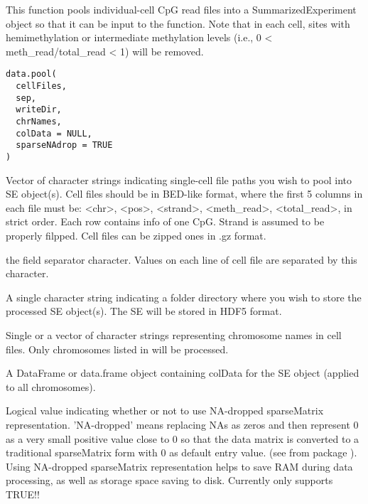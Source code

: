 \documentclass[letterpaper]{book}
\begin{document}
%
\begin{Description}
This function pools individual-cell CpG read files into a
SummarizedExperiment object so that it can be input to the 
function. Note that in each cell, sites with hemimethylation or intermediate
methylation levels (i.e., 0 < meth\_read/total\_read < 1) will be removed.
\end{Description}
%
\begin{Usage}
\begin{verbatim}
data.pool(
  cellFiles,
  sep,
  writeDir,
  chrNames,
  colData = NULL,
  sparseNAdrop = TRUE
)
\end{verbatim}
\end{Usage}
%
\begin{Arguments}
\begin{ldescription}
\item[\code{cellFiles}] Vector of character strings indicating single-cell file
paths you wish to pool into SE object(s). Cell files should be in BED-like
format, where the first 5 columns in each file must be: <chr>, <pos>, <strand>,
<meth\_read>, <total\_read>, in strict order. Each row contains info of one CpG.
Strand is assumed to be properly filpped. Cell files can be zipped ones in .gz
format.

\item[\code{sep}] the field separator character. Values on each line of cell file are
separated by this character.

\item[\code{writeDir}] A single character string indicating a folder directory where
you wish to store the processed SE object(s). The SE will be stored in HDF5 format.

\item[\code{chrNames}] Single or a vector of character strings representing chromosome
names in cell files. Only chromosomes listed in  will be
processed.

\item[\code{colData}] A DataFrame or data.frame object containing colData for the SE
object (applied to all chromosomes).

\item[\code{sparseNAdrop}] Logical value indicating whether or not to use NA-dropped
sparseMatrix representation. 'NA-dropped' means replacing NAs as zeros and
then represent 0 as a very small positive value close to 0 so that the data
matrix is converted to a traditional sparseMatrix form with 0 as default
entry value. (see  from package ).
Using NA-dropped sparseMatrix representation helps to save RAM during data
processing, as well as storage space saving to disk. Currently only supports
TRUE!!
\end{ldescription}
\end{Arguments}
\end{document}
